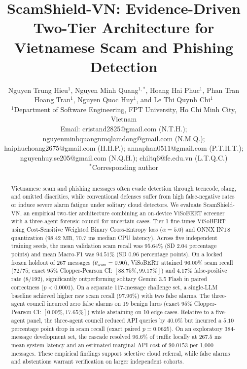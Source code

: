 \documentclass[journal]{IEEEtran}
\begin{document}
\renewcommand{\thesection}{\Roman{section}}
\renewcommand{\thesubsection}{\thesection.\Alph{subsection}}

\title{ScamShield-VN: Evidence-Driven Two-Tier Architecture for Vietnamese Scam and Phishing Detection}

\author{
    Nguyen Trung Hieu$^{1}$,
    Nguyen Minh Quang$^{1,*}$,
    Hoang Hai Phuc$^{1}$,
    Phan Tran Hoang Tran$^{1}$,
    Nguyen Quoc Huy$^{1}$, and
    Le Thi Quynh Chi$^{1}$\\[0.4em]
    $^{1}$Department of Software Engineering, FPT University, Ho Chi Minh City, Vietnam\\[0.2em]
    Email: cristand2825@gmail.com (N.T.H.); nguyenminhquangnmqlamdong@gmail.com (N.M.Q.);\\
    haiphuchoang2675@gmail.com (H.H.P.); annaphan0511@gmail.com (P.T.H.T.);\\
    nguyenhuy.se205@gmail.com (N.Q.H.); chiltq6@fe.edu.vn (L.T.Q.C.)\\[0.2em]
    $^*$Corresponding author
}

\maketitle

\begin{abstract}
Vietnamese scam and phishing messages often evade detection through teencode, slang, and omitted diacritics, while conventional defenses suffer from high false-negative rates or induce severe alarm fatigue under solitary cloud detectors. We evaluate ScamShield-VN, an empirical two-tier architecture combining an on-device ViSoBERT screener with a three-agent forensic council for uncertain cases. Tier 1 fine-tunes ViSoBERT using Cost-Sensitive Weighted Binary Cross-Entropy loss ($\alpha = 5.0$) and ONNX INT8 quantization ($98.42\text{ MB}$, $70.7\text{ ms}$ median CPU latency). Across five independent training seeds, the mean validation scam recall was $95.64\%$ (SD $2.04$ percentage points) and mean Macro-F1 was $94.51\%$ (SD $0.96$ percentage points). On a locked frozen holdout of 267 messages ($\theta_{\text{scam}} = 0.90$), ViSoBERT attained $96.00\%$ scam recall ($72/75$; exact $95\%$ Clopper-Pearson CI: $[88.75\%, 99.17\%]$) and $4.17\%$ false-positive rate ($8/192$), significantly outperforming solitary Gemini 3.5 Flash in paired correctness ($p < 0.0001$). On a separate 117-message challenge set, a single-LLM baseline achieved higher raw scam recall ($97.96\%$) with two false alarms. The three-agent council incurred zero false alarms on 19 benign lures (exact $95\%$ Clopper-Pearson CI: $[0.00\%, 17.65\%]$) while abstaining on 10 edge cases. Relative to a five-agent panel, the three-agent council reduced API queries by $40.0\%$ but incurred a $5.10$ percentage point drop in scam recall (exact paired $p = 0.0625$). On an exploratory 384-message development set, the cascade resolved $96.6\%$ of traffic locally at $267.5\text{ ms}$ mean system latency and an estimated marginal API cost of $\$0.0153$ per 1,000 messages. These empirical findings support selective cloud referral, while false alarms and abstentions warrant verification on larger independent cohorts.
\end{abstract}
\end{document}
